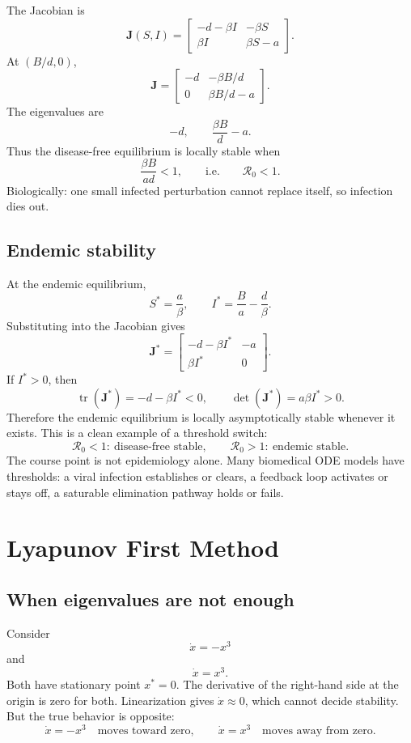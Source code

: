 \documentclass[a4paper]{article}
\DeclareMathOperator{\tr}{tr}
\newcommand{\mat}[1]{\mathbf{#1}}
\newcommand{\J}{\mat J}
\newcommand{\Rzero}{\mathcal R_0}
\begin{document}
The Jacobian is
\[
  \J(S,I)=
  \begin{bmatrix}
  -d-\beta I & -\beta S\\
  \beta I & \beta S-a
  \end{bmatrix}.
\]
At \((B/d,0)\),
\[
  \J=
  \begin{bmatrix}
  -d & -\beta B/d\\
  0 & \beta B/d-a
  \end{bmatrix}.
\]
The eigenvalues are
\[
  -d,\qquad \frac{\beta B}{d}-a.
\]
Thus the disease-free equilibrium is locally stable when
\[
  \frac{\beta B}{ad}<1,
  \qquad\text{i.e.}\qquad \Rzero<1.
\]
Biologically: one small infected perturbation cannot replace itself, so infection dies out.

\subsection{Endemic stability}

At the endemic equilibrium,
\[
  S^\ast=\frac{a}{\beta},\qquad
  I^\ast=\frac{B}{a}-\frac{d}{\beta}.
\]
Substituting into the Jacobian gives
\[
  \J^\ast=
  \begin{bmatrix}
  -d-\beta I^\ast & -a\\
  \beta I^\ast & 0
  \end{bmatrix}.
\]
If \(I^\ast>0\), then
\[
  \tr(\J^\ast)=-d-\beta I^\ast<0,\qquad
  \det(\J^\ast)=a\beta I^\ast>0.
\]
Therefore the endemic equilibrium is locally asymptotically stable whenever it exists. This is a clean example of a threshold switch:
\[
  \Rzero<1:\ \text{disease-free stable},\qquad
  \Rzero>1:\ \text{endemic stable}.
\]
The course point is not epidemiology alone. Many biomedical ODE models have thresholds: a viral infection establishes or clears, a feedback loop activates or stays off, a saturable elimination pathway holds or fails.

\section{Lyapunov First Method}

\subsection{When eigenvalues are not enough}

Consider
\[
  \dot x=-x^3
\]
and
\[
  \dot x=x^3.
\]
Both have stationary point \(x^\ast=0\). The derivative of the right-hand side at the origin is zero for both. Linearization gives \(\dot x\approx 0\), which cannot decide stability. But the true behavior is opposite:
\[
  \dot x=-x^3 \quad\text{moves toward zero},\qquad
  \dot x=x^3 \quad\text{moves away from zero}.
\]
\end{document}
